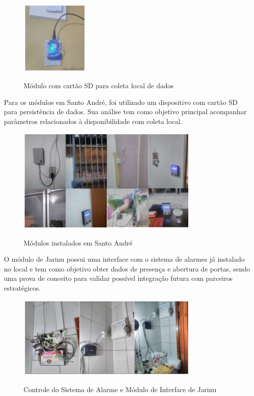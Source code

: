 \begin{figure}[H]
	\centering
	\caption{Módulo com cartão SD para coleta local de dados}
	\includegraphics[width=0.3\textwidth]{SDColetaDados}
	\label{fig:SDColetaDados}
\end{figure}

Para os módulos em Santo André, foi utilizado um dispositivo com cartão SD para persistência de dados. Sua análise tem como objetivo principal acompanhar parâmetros relacionados à disponibilidade com coleta local.

\begin{figure}[H]
	\centering
	\caption{Módulos instalados em Santo André}
	\includegraphics[width=0.8\textwidth]{ModulosStoAndre}
	\label{fig:ModulosStoAndre}
\end{figure}

O módulo de Jarinu possui uma interface com o sistema de alarmes já instalado no local e tem como objetivo obter dados de presença e abertura de portas, sendo uma prova de conceito para validar possível integração futura com parceiros estratégicos.

\begin{figure}[H]
	\centering
	\caption{Controle do Sistema de Alarme e Módulo de Interface de Jarinu}
	\includegraphics[width=0.8\textwidth]{ModuloSistAlarme}
	\label{fig:ModuloSistAlarme}
\end{figure}

